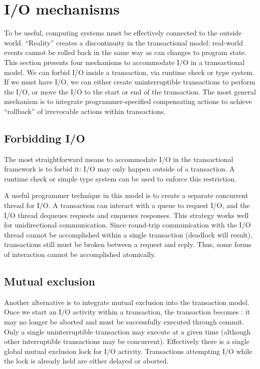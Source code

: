 \section{I/O mechanisms}\label{sec:io}
To be useful, computing systems must be effectively connected to the
outside world.  ``Reality'' creates a discontinuity in the transactional model:
real-world events cannot be rolled back in the same way as can changes
to program state.  This section presents four mechanisms to
accommodate I/O in a transactional model.  We can forbid I/O inside a
transaction, via runtime check or type system.  If we must have I/O,
we can either create uninterruptible transactions to perform the I/O,
or move the I/O to the start or end of the transaction.  The most
general mechanism is to integrate programmer-specified compensating
actions to achieve ``rollback'' of irrevocable actions within transactions.

\subsection{Forbidding I/O}
The most straightforward means to accommodate I/O in the
transactional framework is to forbid it: I/O may only happen outside
of a transaction.  A runtime check or simple type system can be used
to enforce this restriction.

A useful programmer technique in this model is to create a separate concurrent
thread for I/O\@.  A transaction can interact with a queue to request
I/O, and the I/O thread dequeues requests and enqueues responses.
This strategy works well for unidirectional communication.
Since round-trip communication with the I/O thread cannot be accomplished
within a single transaction (deadlock will result), transactions
still must be broken between a request and reply.  Thus, some forms of
interaction cannot be accomplished atomically.

\subsection{Mutual exclusion}
Another alternative is to integrate mutual exclusion into the
transaction model.  Once we start an I/O activity within a transaction,
the transaction becomes : it may no longer be
aborted and must be successfully executed through commit.
Only a single uninterruptible transaction may execute at a given time
(although other interruptible transactions may be concurrent).
Effectively there is a single global mutual exclusion lock for I/O
activity.  Transactions attempting I/O while the lock is already held
are either delayed or aborted.


